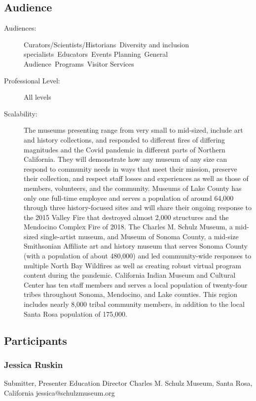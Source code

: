 \documentclass{report}
\begin{document}
              \subsection*{Audience}
                \begin{description}
                  \item [Audiences:]Curators/Scientists/Historians~Diversity and inclusion specialists~Educators~Events Planning~General Audience~Programs~Visitor Services~
                  \item[Professional Level:]All levels~
                \item[Scalability:]   The museums presenting range from very small to mid-sized, include art and history collections, and responded to different fires of differing magnitudes and the Covid pandemic in different parts of Northern California. They will demonstrate how any museum of any size can respond to community needs in ways that meet their mission, preserve their collection, and respect staff losses and experiences as well as those of members, volunteers, and the community.
Museums of Lake County has only one full-time employee and serves a population of around 64,000 through three history-focused sites and will share their ongoing response to the 2015 Valley Fire that destroyed almost 2,000 structures and the Mendocino Complex Fire of 2018. The Charles M. Schulz Museum, a mid-sized single-artist museum, and Museum of Sonoma County, a mid-size Smithsonian Affiliate art and history museum that serves Sonoma County (with a population of about 480,000) and led community-wide responses to multiple North Bay Wildfires as well as creating robust virtual program content during the pandemic.
California Indian Museum and Cultural Center has ten staff members and serves a local population of twenty-four tribes throughout Sonoma, Mendocino, and Lake counties. This region includes nearly 8,000 tribal community members, in addition to the local Santa Rosa population of 175,000.

  

							
              \end{description}
            \subsection*{Participants}
              \subsubsection*{ Jessica Ruskin }
              Submitter, Presenter\newline
              Education Director\newline
              Charles M. Schulz Museum, Santa Rosa, California
              \newline
              jessica@schulzmuseum.org\newline
              
\end{document}

